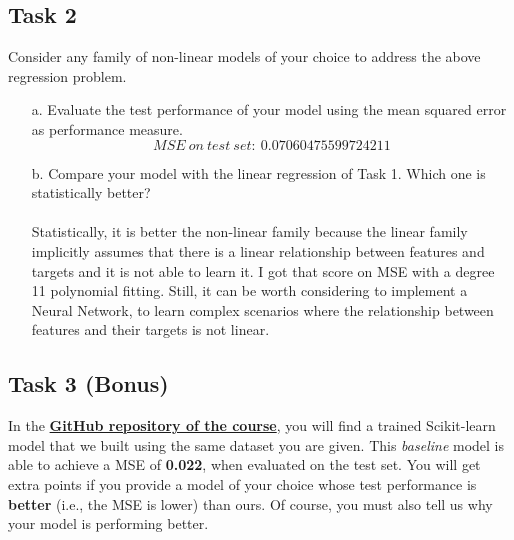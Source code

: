 \documentclass[11pt]{scrartcl}
\begin{document}
\subsection*{Task 2}
Consider any family of non-linear models of your choice to address the above regression problem.
\begin{itemize}
	\item [a.] Evaluate the test performance of your model using the mean squared error as performance measure. 
 $$MSE\ on\ test\ set:\ 0.07060475599724211 $$
	\item [b.] Compare your model with the linear regression of Task 1. Which one is {statistically} better?\\\\
 Statistically, it is better the non-linear family because the linear family implicitly assumes that there is a linear relationship between features and targets and it is not able to learn it. I got that score on MSE with a degree 11 polynomial fitting. Still, it can be worth considering to implement a Neural Network, to learn complex scenarios where the relationship between features and their targets is not linear.
\end{itemize}

\subsection*{Task 3 (Bonus)}
In the \href{https://github.com/GiorgiaAuroraAdorni/ML-bachelor-course-assignments-sp23}{\textbf{GitHub repository of the course}}, you will find a trained Scikit-learn model that we built using the same dataset you are given. 
This \textit{baseline} model is able to achieve a MSE of \textbf{0.022}, when evaluated on the test set. 
You will get extra points if you provide a model of your choice whose test performance is \textbf{better} (i.e., the MSE is lower) than ours. Of course, you must also tell us why your model is performing better.
\\
\end{document}
